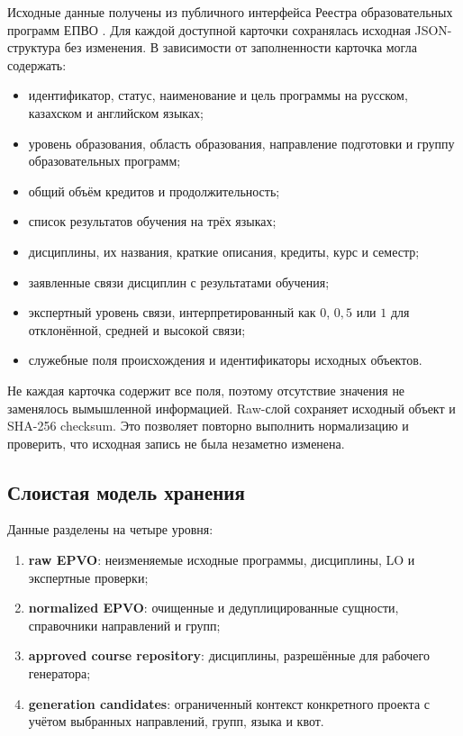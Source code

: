 \documentclass[twoside,11pt]{article}
\begin{document}
Исходные данные получены из публичного интерфейса Реестра образовательных программ ЕПВО \cite{EPVORegistry}. Для каждой доступной карточки сохранялась исходная JSON-структура без изменения. В зависимости от заполненности карточка могла содержать:
\begin{itemize}
  \item идентификатор, статус, наименование и цель программы на русском, казахском и английском языках;
  \item уровень образования, область образования, направление подготовки и группу образовательных программ;
  \item общий объём кредитов и продолжительность;
  \item список результатов обучения на трёх языках;
  \item дисциплины, их названия, краткие описания, кредиты, курс и семестр;
  \item заявленные связи дисциплин с результатами обучения;
  \item экспертный уровень связи, интерпретированный как $0$, $0{,}5$ или $1$ для отклонённой, средней и высокой связи;
  \item служебные поля происхождения и идентификаторы исходных объектов.
\end{itemize}

Не каждая карточка содержит все поля, поэтому отсутствие значения не заменялось вымышленной информацией. Raw-слой сохраняет исходный объект и SHA-256 checksum. Это позволяет повторно выполнить нормализацию и проверить, что исходная запись не была незаметно изменена.

\subsection{Слоистая модель хранения}

Данные разделены на четыре уровня:
\begin{enumerate}
  \item \textbf{raw EPVO}: неизменяемые исходные программы, дисциплины, LO и экспертные проверки;
  \item \textbf{normalized EPVO}: очищенные и дедуплицированные сущности, справочники направлений и групп;
  \item \textbf{approved course repository}: дисциплины, разрешённые для рабочего генератора;
  \item \textbf{generation candidates}: ограниченный контекст конкретного проекта с учётом выбранных направлений, групп, языка и квот.
\end{enumerate}
\end{document}
